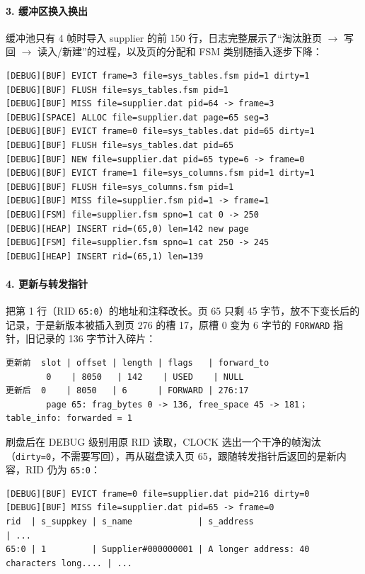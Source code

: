 \documentclass[11pt,a4paper]{ctexart}
\newcommand{\code}[1]{\texttt{#1}}
\begin{document}
\paragraph{3. 缓冲区换入换出} 缓冲池只有 4 帧时导入 supplier 的前 150 行，日志完整展示了“淘汰脏页 $\rightarrow$ 写回 $\rightarrow$ 读入/新建”的过程，以及页的分配和 FSM 类别随插入逐步下降：

\begin{lstlisting}[style=plain]
[DEBUG][BUF] EVICT frame=3 file=sys_tables.fsm pid=1 dirty=1
[DEBUG][BUF] FLUSH file=sys_tables.fsm pid=1
[DEBUG][BUF] MISS file=supplier.dat pid=64 -> frame=3
[DEBUG][SPACE] ALLOC file=supplier.dat page=65 seg=3
[DEBUG][BUF] EVICT frame=0 file=sys_tables.dat pid=65 dirty=1
[DEBUG][BUF] FLUSH file=sys_tables.dat pid=65
[DEBUG][BUF] NEW file=supplier.dat pid=65 type=6 -> frame=0
[DEBUG][BUF] EVICT frame=1 file=sys_columns.fsm pid=1 dirty=1
[DEBUG][BUF] FLUSH file=sys_columns.fsm pid=1
[DEBUG][BUF] MISS file=supplier.fsm pid=1 -> frame=1
[DEBUG][FSM] file=supplier.fsm spno=1 cat 0 -> 250
[DEBUG][HEAP] INSERT rid=(65,0) len=142 new page
[DEBUG][FSM] file=supplier.fsm spno=1 cat 250 -> 245
[DEBUG][HEAP] INSERT rid=(65,1) len=139
\end{lstlisting}

\paragraph{4. 更新与转发指针} 把第 1 行（RID \code{65:0}）的地址和注释改长。页 65 只剩 45 字节，放不下变长后的记录，于是新版本被插入到页 276 的槽 17，原槽 0 变为 6 字节的 \code{FORWARD} 指针，旧记录的 136 字节计入碎片：

\begin{lstlisting}[style=plain]
更新前  slot | offset | length | flags   | forward_to
        0    | 8050   | 142    | USED    | NULL
更新后  0    | 8050   | 6      | FORWARD | 276:17
        page 65: frag_bytes 0 -> 136, free_space 45 -> 181；table_info: forwarded = 1
\end{lstlisting}

刷盘后在 DEBUG 级别用原 RID 读取，CLOCK 选出一个干净的帧淘汰（\code{dirty=0}，不需要写回），再从磁盘读入页 65，跟随转发指针后返回的是新内容，RID 仍为 \code{65:0}：

\begin{lstlisting}[style=wide]
[DEBUG][BUF] EVICT frame=0 file=supplier.dat pid=216 dirty=0
[DEBUG][BUF] MISS file=supplier.dat pid=65 -> frame=0
rid  | s_suppkey | s_name             | s_address                                | ...
65:0 | 1         | Supplier#000000001 | A longer address: 40 characters long.... | ...
\end{lstlisting}
\end{document}
